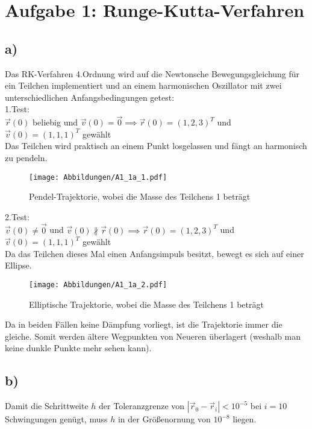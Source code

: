 



\maketitle

\section*{Aufgabe 1: Runge-Kutta-Verfahren}
\subsection*{a)}

Das RK-Verfahren 4.Ordnung wird auf die Newtonsche Bewegungsgleichung für ein Teilchen implementiert und an einem harmonischen Oszillator mit zwei unterschiedlichen Anfangsbedingungen getest:\\
1.Test:\\
$\vec{r}(0)$ beliebig und $\vec{v}(0)=\vec{0} \implies \vec{r}(0) = (1,2,3)^T$ und $\vec{v}(0) = (1,1,1)^T$ gewählt\\
Das Teilchen wird praktisch an einem Punkt losgelassen und fängt an harmonisch
zu pendeln.

\begin{figure}[H]
    \centering
    \texttt{[image: Abbildungen/A1\_1a\_1.pdf]}
    \caption{Pendel-Trajektorie, wobei die Masse des Teilchens 1 beträgt}
    \label{fig:A1_1a_1}
\end{figure}

\noindent
2.Test:\\
$\vec{v}(0) \neq \vec{0}$ und $\vec{v}(0) \nparallel \vec{r}(0)  \implies \vec{r}(0) = (1,2,3)^T$ und $\vec{v}(0) = (1,1,1)^T$ gewählt\\
Da das Teilchen dieses Mal einen Anfangsimpuls besitzt, bewegt es sich auf einer
Ellipse.

\begin{figure}[H]
    \centering
    \texttt{[image: Abbildungen/A1\_1a\_2.pdf]}
    \caption{Elliptische Trajektorie, wobei die Masse des Teilchens 1 beträgt}
    \label{fig:A1_1a_2}
\end{figure}
\noindent
Da in beiden Fällen keine Dämpfung vorliegt, ist die Trajektorie immer die gleiche.
Somit werden ältere Wegpunkten von Neueren überlagert (weshalb man keine dunkle Punkte mehr sehen kann).

\subsection*{b)}
Damit die Schrittweite $h$ der Toleranzgrenze von $\left|\vec{r}_{0}-\vec{r}_{i}\right|<10^{-5}$ bei $i=10$ Schwingungen genügt, muss $h$ in der Größenornung von $10^{-8}$ liegen.

